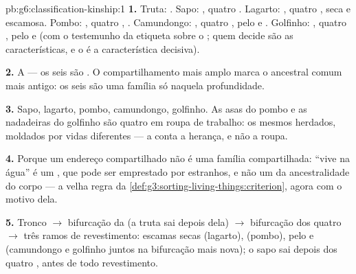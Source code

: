 \begin{solution}{pb:g6:classification-kinship:1}
\textbf{1.} Truta: . Sapo: , quatro
. Lagarto: , quatro ,  seca e
escamosa. Pombo: , quatro , . Camundongo:
, quatro , pelo e . Golfinho: , quatro , pelo e  (com o testemunho da etiqueta
sobre o ; quem decide são as características, e o  é a
característica decisiva).

\textbf{2.} A  --- os seis são . O
compartilhamento mais amplo marca o ancestral comum mais antigo: os
seis são uma família só naquela profundidade.

\textbf{3.} Sapo, lagarto, pombo, camundongo, golfinho. As asas do
pombo e as nadadeiras do golfinho são quatro  em roupa de
trabalho: os mesmos  herdados, moldados por vidas diferentes ---
a  conta a herança, e não a roupa.

\textbf{4.} Porque um endereço compartilhado não é uma família
compartilhada: ``vive na água'' é um , que pode ser emprestado
por estranhos, e não um  da ancestralidade do corpo --- a velha
regra da \cref{def:g3:sorting-living-things:criterion}, agora com o
motivo dela.

\textbf{5.} Tronco $\rightarrow$ bifurcação da  (a
truta sai depois dela) $\rightarrow$ bifurcação dos quatro 
$\rightarrow$ três ramos de revestimento: escamas secas (lagarto),
 (pombo), pelo e  (camundongo e golfinho juntos na
bifurcação mais nova); o sapo sai depois dos quatro , antes de
todo revestimento.


\end{solution}
